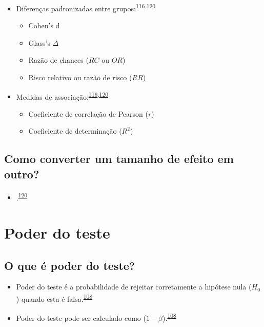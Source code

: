 \documentclass[
  a4paper,
]{book}
\providecommand{\tightlist}{%
  \setlength{\itemsep}{0pt}\setlength{\parskip}{0pt}}
\begin{document}
\begin{itemize}
\item
  Diferenças padronizadas entre grupos:\textsuperscript{\protect\hyperlink{ref-Sullivan2012}{116},\protect\hyperlink{ref-Kim2015}{120}}

  \begin{itemize}
  \item
    Cohen's d
  \item
    Glass's \(\Delta\)
  \item
    Razão de chances (\(RC\) ou \(OR\))
  \item
    Risco relativo ou razão de risco (\(RR\))
  \end{itemize}
\item
  Medidas de associação:\textsuperscript{\protect\hyperlink{ref-Sullivan2012}{116},\protect\hyperlink{ref-Kim2015}{120}}

  \begin{itemize}
  \item
    Coeficiente de correlação de Pearson (\(r\))
  \item
    Coeficiente de determinação (\(R^2\))
  \end{itemize}
\end{itemize}

\hypertarget{como-converter-um-tamanho-de-efeito-em-outro}{%
\subsection{Como converter um tamanho de efeito em outro?}\label{como-converter-um-tamanho-de-efeito-em-outro}}

\begin{itemize}
\tightlist
\item
  .\textsuperscript{\protect\hyperlink{ref-Kim2015}{120}}
\end{itemize}

\hypertarget{poder-teste}{%
\section{Poder do teste}\label{poder-teste}}

\hypertarget{o-que-uxe9-poder-do-teste}{%
\subsection{O que é poder do teste?}\label{o-que-uxe9-poder-do-teste}}

\begin{itemize}
\item
  Poder do teste é a probabilidade de rejeitar corretamente a hipótese nula (\(H_{0}\)) quando esta é falsa.\textsuperscript{\protect\hyperlink{ref-Curran-Everett2009}{108}}
\item
  Poder do teste pode ser calculado como (\(1 - \beta\)).\textsuperscript{\protect\hyperlink{ref-Curran-Everett2009}{108}}
\end{itemize}
\end{document}
